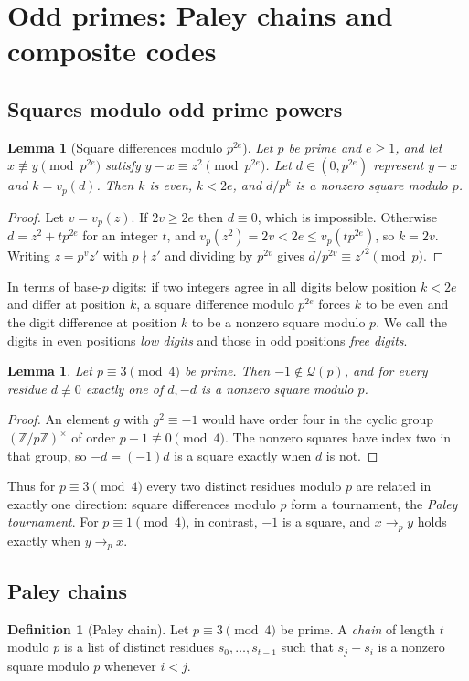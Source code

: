 \documentclass[11pt]{article}
\newtheorem{lemma}[theorem]{Lemma}
\theoremstyle{definition}
\newtheorem{definition}[theorem]{Definition}
\theoremstyle{remark}
\newcommand{\Z}{\mathbb Z}
\newcommand{\QR}{\mathcal Q}
\begin{document}
\section{Odd primes: Paley chains and composite codes}\label{sec:odd}
\subsection{Squares modulo odd prime powers}
\begin{lemma}[Square differences modulo $p^{2e}$]\label{lem:padic}
Let $p$ be prime and $e\ge1$, and let $x\not\equiv y\pmod{p^{2e}}$ satisfy
$y-x\equiv z^2\pmod{p^{2e}}$. Let $d\in(0,p^{2e})$ represent $y-x$ and
$k=v_p(d)$. Then $k$ is even, $k<2e$, and $d/p^k$ is a nonzero square
modulo $p$.
\end{lemma}
\begin{proof}
Let $v=v_p(z)$. If $2v\ge2e$ then $d\equiv0$, which is impossible. Otherwise
$d=z^2+tp^{2e}$ for an integer $t$, and $v_p(z^2)=2v<2e\le v_p(tp^{2e})$, so
$k=2v$. Writing $z=p^vz'$ with $p\nmid z'$ and dividing by $p^{2v}$ gives
$d/p^{2v}\equiv z'^2\pmod p$.
\end{proof}
In terms of base-$p$ digits: if two integers agree in all digits below
position $k<2e$ and differ at position $k$, a square difference modulo
$p^{2e}$ forces $k$ to be even and the digit difference at position $k$ to be
a nonzero square modulo $p$. We call the digits in even positions \emph{low
digits} and those in odd positions \emph{free digits}.

\begin{lemma}\label{lem:minusone}
Let $p\equiv3\pmod4$ be prime. Then $-1\notin\QR(p)$, and for every residue
$d\not\equiv0$ exactly one of $d,-d$ is a nonzero square modulo $p$.
\end{lemma}
\begin{proof}
An element $g$ with $g^2\equiv-1$ would have order four in the cyclic group
$(\Z/p\Z)^\times$ of order $p-1\not\equiv0\pmod4$. The nonzero squares have
index two in that group, so $-d=(-1)d$ is a square exactly when $d$ is not.
\end{proof}
Thus for $p\equiv3\pmod4$ every two distinct residues modulo $p$ are related
in exactly one direction: square differences modulo $p$ form a tournament,
the \emph{Paley tournament}. For $p\equiv1\pmod4$, in contrast, $-1$ is a
square, and $x\to_py$ holds exactly when $y\to_px$.

\subsection{Paley chains}
\begin{definition}[Paley chain]\label{def:chain}
Let $p\equiv3\pmod4$ be prime. A \emph{chain} of length $t$ modulo $p$ is a
list of distinct residues $s_0,\ldots,s_{t-1}$ such that $s_j-s_i$ is a
nonzero square modulo $p$ whenever $i<j$.
\end{definition}
\end{document}
